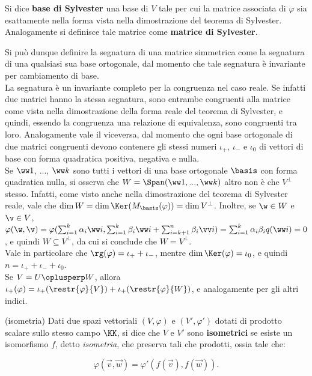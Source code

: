\documentclass[11pt]{article}
\begin{document}
	\begin{definition}
		Si dice \textbf{base di Sylvester} una base di $V$ tale per cui la
		matrice associata di $\varphi$ sia esattamente nella forma
		vista nella dimostrazione del teorema di Sylvester. Analogamente
		si definisce tale matrice come \textbf{matrice di Sylvester}.
	\end{definition}

	\begin{remark} \nl
		\li Si può dunque definire la segnatura di una matrice simmetrica
		come la segnatura di una qualsiasi sua base ortogonale, dal
		momento che tale segnatura è invariante per cambiamento di base. \\
		\li La segnatura è un invariante completo per la congruenza nel caso reale. Se infatti due matrici hanno la stessa segnatura, sono
		entrambe congruenti alla matrice come vista nella dimostrazione
		della forma reale del teorema di Sylvester, e quindi, essendo
		la congruenza una relazione di equivalenza, sono congruenti
		tra loro. Analogamente vale il viceversa, dal momento che ogni
		base ortogonale di due matrici congruenti devono contenere gli
		stessi numeri $\iota_+$, $\iota_-$ e $\iota_0$ di vettori
		di base con forma quadratica positiva, negativa e nulla. \\
		\li Se $\ww 1$, ..., $\ww k$ sono tutti i vettori di una base
		ortogonale $\basis$ con forma quadratica nulla, si osserva che $W = \Span(\ww 1, ..., \ww k)$ altro non è che $V^\perp$ stesso. Infatti, come
		visto anche nella dimostrazione del teorema di Sylvester reale, vale
		che	$\dim W = \dim \Ker (M_\basis(\varphi)) = \dim V^\perp$. Inoltre,
		se $\w \in W$ e $\v \in V$, $\varphi(\w, \v) = \varphi(\sum_{i=1}^k
		\alpha_i \ww i, \sum_{i=1}^k \beta_i \ww i + \sum_{i=k+1}^n \beta_i \vv i)
		= \sum_{i=1}^k \alpha_i \beta_i q(\ww i) = 0$, e quindi
		$W \subseteq V^\perp$, da cui si conclude che $W = V^\perp$. \\
		\li Vale in particolare che $\rg(\varphi) = \iota_+ + \iota_-$, mentre
		$\dim \Ker(\varphi) = \iota_0$, e quindi $n = \iota_+ + \iota_- + \iota_0$. \\
		\li Se $V = U \oplusperp W$, allora $\iota_+(\varphi) = \iota_+(\restr{\varphi}{V}) + \iota_+(\restr{\varphi}{W})$, e
			analogamente per gli altri indici.
	\end{remark}

	\begin{definition} (isometria)
		Dati due spazi vettoriali $(V, \varphi)$ e
		$(V', \varphi')$ dotati di prodotto scalare sullo stesso campo $\KK$, si dice che
		$V$ e $V'$ sono \textbf{isometrici} se esiste un isomorfismo
		$f$, detto \textit{isometria}, che preserva tali che prodotti, ossia tale che:
		
		\[ \varphi(\vec v, \vec w) = \varphi'(f(\vec v), f(\vec w)). \]
	\end{definition}
\end{document}
